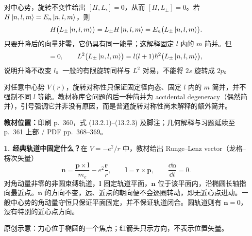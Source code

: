 对中心势，旋转不变性给出 $[H,L_i]=0$，从而 $[H,L_\pm]=0$。若 $H\left|n,l,m\right\rangle=E_n\left|n,l,m\right\rangle$，则
\begin{equation}
  H\bigl(L_\pm\left|n,l,m\right\rangle\bigr)
    =L_\pm H\left|n,l,m\right\rangle
    =E_n\bigl(L_\pm\left|n,l,m\right\rangle\bigr).
\end{equation}
只要升降后的向量非零，它仍具有同一能量；这解释固定 $l$ 内的 $m$ 简并。但
\begin{equation}
  [L^2,L_\pm]=0,\qquad
  L^2\bigl(L_\pm\ket{n,l,m}\bigr)
    =l(l+1)\hbar^2\bigl(L_\pm\ket{n,l,m}\bigr),
\end{equation}
说明升降不改变 $l$。一般的有限旋转同样与 $L^2$ 对易，不能将 $2s$ 旋转成 $2p$。

对任意中心势 $V(r)$，旋转对称性只保证固定径向态、固定 $l$ 内的 $m$ 简并，并不强制不同 $l$ 等能。教材称库仑问题的后一种简并为 accidental degeneracy（偶然简并），引号强调它并非没有原因，而是普通旋转对称性尚未解释的额外简并。

\textbf{教材位置：}印刷 p.~360，式 (13.2.1)--(13.2.3) 及脚注；几何解释与习题延续至 p.~361 上部 / PDF pp.~368--369。

\textbf{1. 经典轨道中固定什么？}在 $V=-e^2/r$ 中，教材给出 Runge--Lenz vector（龙格--楞次矢量）
\begin{equation}
  \boxed{\mathbf n=\frac{\mathbf p\times\mathbf l}{m_e}
     -e^2\frac{\mathbf r}{r},\qquad
     \mathbf l=\mathbf r\times\mathbf p,\qquad
     \frac{\dd\mathbf n}{\dd t}=0.}
\end{equation}
对角动量非零的非圆束缚轨道，$\mathbf l$ 固定轨道平面，$\mathbf n$ 位于该平面内，沿椭圆长轴指向最近点。$\mathbf n$ 的方向不变，远、近点的朝向便不会逐圈转动，即无近心点进动。一般中心势的角动量守恒只保证平面固定，并不保证轨道闭合。圆轨道则有 $\mathbf n=0$，没有特别的近心点方向。

\begin{center}
\begin{minipage}{\linewidth}
\centering
{}

\small 原创示意：力心位于椭圆的一个焦点；红箭头只示方向，不表示位置矢量。
\end{minipage}
\end{center}

